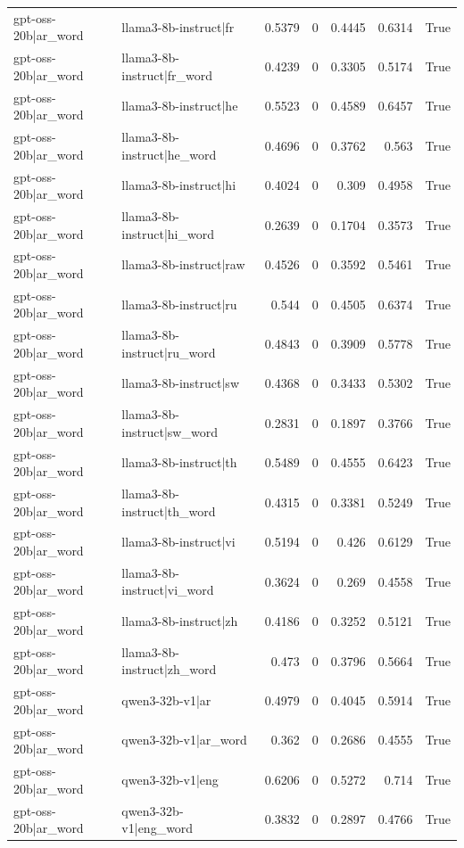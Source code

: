 \begin{table}
\begin{tabular}{l l r r r r l}
gpt-oss-20b|ar_word & llama3-8b-instruct|fr & 0.5379 & 0 & 0.4445 & 0.6314 & True \\
gpt-oss-20b|ar_word & llama3-8b-instruct|fr_word & 0.4239 & 0 & 0.3305 & 0.5174 & True \\
gpt-oss-20b|ar_word & llama3-8b-instruct|he & 0.5523 & 0 & 0.4589 & 0.6457 & True \\
gpt-oss-20b|ar_word & llama3-8b-instruct|he_word & 0.4696 & 0 & 0.3762 & 0.563 & True \\
gpt-oss-20b|ar_word & llama3-8b-instruct|hi & 0.4024 & 0 & 0.309 & 0.4958 & True \\
gpt-oss-20b|ar_word & llama3-8b-instruct|hi_word & 0.2639 & 0 & 0.1704 & 0.3573 & True \\
gpt-oss-20b|ar_word & llama3-8b-instruct|raw & 0.4526 & 0 & 0.3592 & 0.5461 & True \\
gpt-oss-20b|ar_word & llama3-8b-instruct|ru & 0.544 & 0 & 0.4505 & 0.6374 & True \\
gpt-oss-20b|ar_word & llama3-8b-instruct|ru_word & 0.4843 & 0 & 0.3909 & 0.5778 & True \\
gpt-oss-20b|ar_word & llama3-8b-instruct|sw & 0.4368 & 0 & 0.3433 & 0.5302 & True \\
gpt-oss-20b|ar_word & llama3-8b-instruct|sw_word & 0.2831 & 0 & 0.1897 & 0.3766 & True \\
gpt-oss-20b|ar_word & llama3-8b-instruct|th & 0.5489 & 0 & 0.4555 & 0.6423 & True \\
gpt-oss-20b|ar_word & llama3-8b-instruct|th_word & 0.4315 & 0 & 0.3381 & 0.5249 & True \\
gpt-oss-20b|ar_word & llama3-8b-instruct|vi & 0.5194 & 0 & 0.426 & 0.6129 & True \\
gpt-oss-20b|ar_word & llama3-8b-instruct|vi_word & 0.3624 & 0 & 0.269 & 0.4558 & True \\
gpt-oss-20b|ar_word & llama3-8b-instruct|zh & 0.4186 & 0 & 0.3252 & 0.5121 & True \\
gpt-oss-20b|ar_word & llama3-8b-instruct|zh_word & 0.473 & 0 & 0.3796 & 0.5664 & True \\
gpt-oss-20b|ar_word & qwen3-32b-v1|ar & 0.4979 & 0 & 0.4045 & 0.5914 & True \\
gpt-oss-20b|ar_word & qwen3-32b-v1|ar_word & 0.362 & 0 & 0.2686 & 0.4555 & True \\
gpt-oss-20b|ar_word & qwen3-32b-v1|eng & 0.6206 & 0 & 0.5272 & 0.714 & True \\
gpt-oss-20b|ar_word & qwen3-32b-v1|eng_word & 0.3832 & 0 & 0.2897 & 0.4766 & True \\

\end{tabular}
\end{table}
